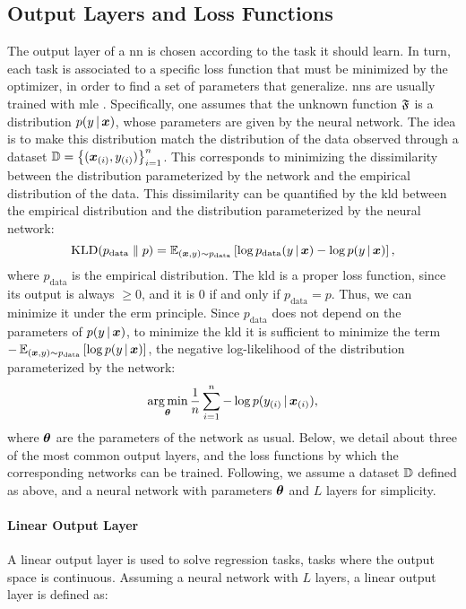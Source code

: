 \subsection{Output Layers and Loss Functions}\label{sec:loss}
The output layer of a \gls{nn} is chosen according to the task it should learn. In turn, each task is associated to a specific loss function that must be minimized by the optimizer, in order to find a set of parameters that generalize. \glspl{nn} are usually trained with \gls{mle} \citep{hastie2009elements}. Specifically, one assumes that the unknown function $\mathfrak{F}$ is a distribution $p(y\given\Vector{x})$, whose parameters are given by the neural network. The idea is to make this distribution match the distribution of the data observed through a dataset $\Data = \Set{(\PatternVector{x}{i}, \Pattern{y}{i})}_{i=1}^n$. This corresponds to minimizing the dissimilarity between the distribution parameterized by the network and the empirical distribution of the data. This dissimilarity can be quantified by the \gls{kld} between the empirical distribution and the distribution parameterized by the neural network:
$$\KLD{p_{\mathrm{data}}}{p} = \Expect_{(\Vector{x}, y) \sim p_{\mathrm{data}}}\Brack{\log p_{\mathrm{data}}(y \given \Vector{x}) - \log p(y \given \Vector{x})},$$
where $p_{\mathrm{data}}$ is the empirical distribution. The \gls{kld} is a proper loss function, since its output is always $\ge 0$, and it is 0 if and only if $p_{\mathrm{data}} = p$. Thus, we can minimize it under the \gls{erm} principle. Since $p_{\mathrm{data}}$ does not depend on the parameters of $p(y \given \Vector{x})$, to minimize the \gls{kld} it is sufficient to minimize the term $- \Expect_{(\Vector{x}, y) \sim p_{\mathrm{data}}}\Brack{\log p(y \given \Vector{x})}$, \ie the negative log-likelihood of the distribution parameterized by the network:
$$\argmin_{\Param} \frac{1}{n} \sum_{i=1}^n -\log p(\Pattern{y}{i} \given \PatternVector{x}{i}),$$
where $\boldsymbol{\theta}$ are the parameters of the network as usual. Below, we detail about three of the most common output layers, and the loss functions by which the corresponding networks can be trained. Following, we assume a dataset $\mathbb{D}$ defined as above, and a neural network with parameters $\boldsymbol{\theta}$ and $L$ layers for simplicity.

\paragraph{Linear Output Layer}
A linear output layer is used to solve regression tasks, \ie tasks where the output space is continuous. Assuming a neural network with $L$ layers, a linear output layer is defined as:

